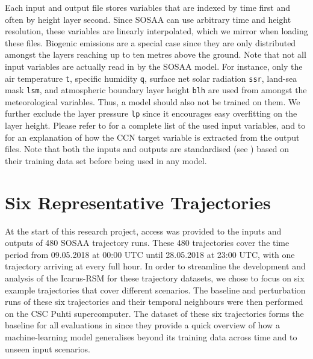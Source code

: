 Each input and output file stores variables that are indexed by time first and often by height layer second. Since SOSAA can use arbitrary time and height resolution, these variables are linearly interpolated, which we mirror when loading these files. Biogenic emissions are a special case since they are only distributed amongst the layers reaching up to ten metres above the ground. Note that not all input variables are actually read in by the SOSAA model. For instance, only the air temperature \texttt{t}, specific humidity \texttt{q}, surface net solar radiation \texttt{ssr}, land-sea mask \texttt{lsm}, and atmospheric boundary layer height \texttt{blh} are used from amongst the meteorological variables. Thus, a model should also not be trained on them. We further exclude the layer pressure \texttt{lp} since it encourages easy overfitting on the layer height. Please refer to  for a complete list of the used input variables, and to  for an explanation of how the CCN target variable is extracted from the output files. Note that both the inputs and outputs are standardised (see ) based on their training data set before being used in any model.

\section{Six Representative Trajectories} \label{txt:six-trajectories}

At the start of this research project, access was provided to the inputs and outputs of 480 SOSAA trajectory runs. These 480 trajectories cover the time period from 09.05.2018 at 00:00 UTC until 28.05.2018 at 23:00 UTC, with one trajectory arriving at every full hour. In order to streamline the development and analysis of the Icarus-RSM for these trajectory datasets, we chose to focus on six example trajectories that cover different scenarios. The baseline and perturbation runs of these six trajectories and their temporal neighbours were then performed on the CSC Puhti supercomputer. The dataset of these six trajectories forms the baseline for all evaluations in  since they provide a quick overview of how a machine-learning model generalises beyond its training data across time and to unseen input scenarios.

